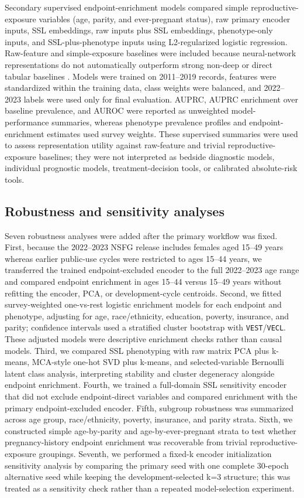 \documentclass[referee,pdflatex,sn-basic,Numbered]{sn-jnl}
\begin{document}
Secondary supervised endpoint-enrichment models compared simple reproductive-exposure variables (age, parity, and ever-pregnant status), raw primary encoder inputs, SSL embeddings, raw inputs plus SSL embeddings, phenotype-only inputs, and SSL-plus-phenotype inputs using L2-regularized logistic regression. Raw-feature and simple-exposure baselines were included because neural-network representations do not automatically outperform strong non-deep or direct tabular baselines \cite{tabular_tree}. Models were trained on 2011--2019 records, features were standardized within the training data, class weights were balanced, and 2022--2023 labels were used only for final evaluation. AUPRC, AUPRC enrichment over baseline prevalence, and AUROC were reported as unweighted model-performance summaries, whereas phenotype prevalence profiles and endpoint-enrichment estimates used survey weights. These supervised summaries were used to assess representation utility against raw-feature and trivial reproductive-exposure baselines; they were not interpreted as bedside diagnostic models, individual prognostic models, treatment-decision tools, or calibrated absolute-risk tools.

\subsection{Robustness and sensitivity analyses}

Seven robustness analyses were added after the primary workflow was fixed. First, because the 2022--2023 NSFG release includes females aged 15--49 years whereas earlier public-use cycles were restricted to ages 15--44 years, we transferred the trained endpoint-excluded encoder to the full 2022--2023 age range and compared endpoint enrichment in ages 15--44 versus 15--49 years without refitting the encoder, PCA, or development-cycle centroids. Second, we fitted survey-weighted one-vs-rest logistic enrichment models for each endpoint and phenotype, adjusting for age, race/ethnicity, education, poverty, insurance, and parity; confidence intervals used a stratified cluster bootstrap with \texttt{VEST}/\texttt{VECL}. These adjusted models were descriptive enrichment checks rather than causal models. Third, we compared SSL phenotyping with raw matrix PCA plus k-means, MCA-style one-hot SVD plus k-means, and selected-variable Bernoulli latent class analysis, interpreting stability and cluster degeneracy alongside endpoint enrichment. Fourth, we trained a full-domain SSL sensitivity encoder that did not exclude endpoint-direct variables and compared enrichment with the primary endpoint-excluded encoder. Fifth, subgroup robustness was summarized across age group, race/ethnicity, poverty, insurance, and parity strata. Sixth, we constructed simple age-by-parity and age-by-ever-pregnant strata to test whether pregnancy-history endpoint enrichment was recoverable from trivial reproductive-exposure groupings. Seventh, we performed a fixed-k encoder initialization sensitivity analysis by comparing the primary seed with one complete 30-epoch alternative seed while keeping the development-selected k=3 structure; this was treated as a sensitivity check rather than a repeated model-selection experiment.
\end{document}
